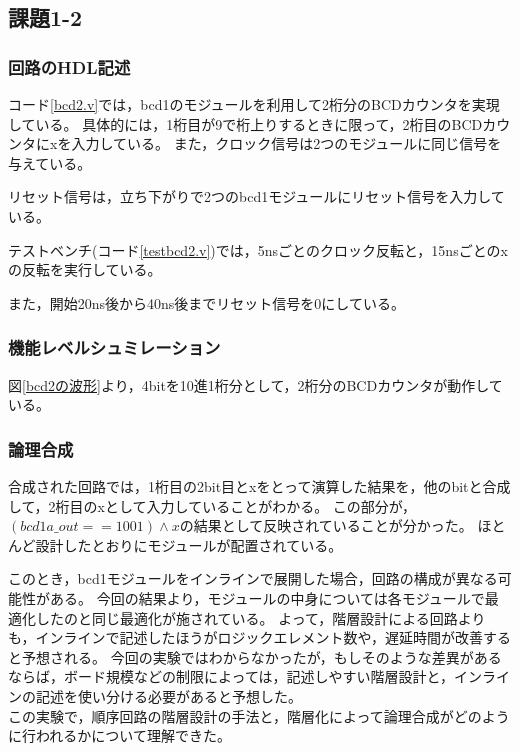 \subsection*{課題1-2}
\subsubsection{回路のHDL記述}
コード\ref{bcd2.v}では，bcd1のモジュールを利用して2桁分のBCDカウンタを実現している。
具体的には，1桁目が9で桁上りするときに限って，2桁目のBCDカウンタにxを入力している。
また，クロック信号は2つのモジュールに同じ信号を与えている。

リセット信号は，立ち下がりで2つのbcd1モジュールにリセット信号を入力している。

テストベンチ(コード\ref{testbcd2.v})では，5nsごとのクロック反転と，15nsごとのxの反転を実行している。

また，開始20ns後から40ns後までリセット信号を0にしている。

\subsubsection{機能レベルシュミレーション}
図\ref{bcd2の波形}より，4bitを10進1桁分として，2桁分のBCDカウンタが動作している。

\subsubsection{論理合成}
合成された回路では，1桁目の2bit目とxをとって演算した結果を，他のbitと合成して，2桁目のxとして入力していることがわかる。
この部分が，$(bcd1a\_out == 1001) \land x$の結果として反映されていることが分かった。
ほとんど設計したとおりにモジュールが配置されている。

このとき，bcd1モジュールをインラインで展開した場合，回路の構成が異なる可能性がある。
今回の結果より，モジュールの中身については各モジュールで最適化したのと同じ最適化が施されている。
よって，階層設計による回路よりも，インラインで記述したほうがロジックエレメント数や，遅延時間が改善すると予想される。
今回の実験ではわからなかったが，もしそのような差異があるならば，ボード規模などの制限によっては，記述しやすい階層設計と，インラインの記述を使い分ける必要があると予想した。\\

この実験で，順序回路の階層設計の手法と，階層化によって論理合成がどのように行われるかについて理解できた。
